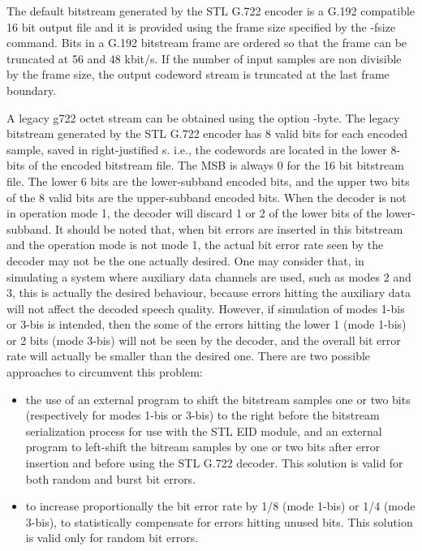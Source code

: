 The default bitstream generated by the STL G.722 encoder is a G.192
compatible 16 bit output file and it is provided using the frame size
specified by the -fsize command. Bits in a G.192 bitstream frame are
ordered so that the frame can be truncated at 56 and 48 kbit/s. If the
number of input samples are non divisible by the frame size, the
output codeword stream is truncated at the last frame boundary.

A legacy g722 octet stream can be obtained using the option -byte.
The legacy bitstream generated by the STL G.722 encoder has 8 valid
bits for each encoded sample, saved in right-justified
{\short}s. i.e., the codewords are located in the lower 8-bits of the
encoded bitstream file. The MSB is always 0 for the 16 bit bitstream
file. The lower 6 bits are the lower-subband encoded bits, and the
upper two bits of the 8 valid bits are the upper-subband encoded
bits. When the decoder is not in operation mode 1, the decoder will
discard 1 or 2 of the lower bits of the lower-subband. It should be
noted that, when bit errors are inserted in this bitstream and the
operation mode is not mode 1, the actual bit error rate seen by the
decoder may not be the one actually desired. One may consider that, in
simulating a system where auxiliary data channels are used, such as
modes 2 and 3, this is actually the desired behaviour, because errors
hitting the auxiliary data will not affect the decoded speech
quality. However, if simulation of modes 1-bis or 3-bis is intended,
then the some of the errors hitting the lower 1 (mode 1-bis) or 2 bits
(mode 3-bis) will not be seen by the decoder, and the overall bit
error rate will actually be smaller than the desired one. There are
two possible approaches to circumvent this problem:
\begin{itemize}
 \item  the use of an external program to shift the bitstream samples
   one or two bits (respectively for modes 1-bis or 3-bis) to the right
   before the bitstream serialization process for use with the STL EID
   module, and an external program to left-shift
   the bitream samples by one or two bits after error insertion and
   before using the STL G.722 decoder. This solution is valid for both
   random and burst bit errors.
 \item  to increase proportionally the bit error rate by 1/8 (mode 1-bis) or
   1/4 (mode 3-bis), to statistically compensate for errors hitting unused 
   bits. This solution is valid only for random bit errors.
\end{itemize}

